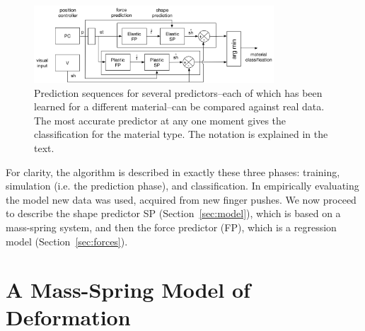\documentclass[journal]{IEEEtran}
\newcommand{\alref}[1]{Algorithm~\ref{#1}}
\newcounter{algorithm}
\begin{document}
\begin{figure}[t]
\centering
\includegraphics[width=0.8\textwidth]{figures/classification}%
\caption{Prediction sequences for several predictors--each of which has been learned for a different material--can be compared against real data. The most accurate predictor at any one moment gives the classification for the material type. The notation is explained in the text.}
\label{fig:classification}
\end{figure}

For clarity, the algorithm is described in exactly these three phases: training, simulation (i.e. the prediction phase), and classification. In empirically evaluating the model new data was used, acquired from new finger pushes. We now proceed to describe the shape predictor SP (Section~\ref{sec:model}), which is based on a mass-spring system, and then the force predictor (FP), which is a regression model (Section~\ref{sec:forces}).

\section{A Mass-Spring Model of Deformation}
\end{document}
